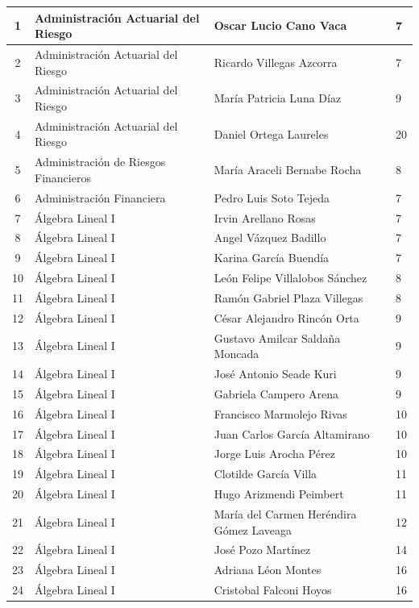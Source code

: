 {\begin{longtable}{|c|p{6.5cm}|p{5cm}|p{1.5cm}|}
1 & Administración Actuarial del Riesgo & Oscar Lucio Cano Vaca & 7 \\ \hline 
2 & Administración Actuarial del Riesgo & Ricardo Villegas Azcorra & 7 \\ \hline 
3 & Administración Actuarial del Riesgo & María Patricia Luna Díaz & 9 \\ \hline 
4 & Administración Actuarial del Riesgo & Daniel Ortega Laureles & 20 \\ \hline 
5 & Administración de Riesgos Financieros & María Araceli Bernabe Rocha & 8 \\ \hline 
6 & Administración Financiera & Pedro Luis Soto Tejeda & 7 \\ \hline 
7 & Álgebra Lineal I & Irvin Arellano Rosas & 7 \\ \hline 
8 & Álgebra Lineal I & Angel Vázquez Badillo & 7 \\ \hline 
9 & Álgebra Lineal I & Karina García Buendía & 7 \\ \hline 
10 & Álgebra Lineal I & León Felipe Villalobos Sánchez & 8 \\ \hline 
11 & Álgebra Lineal I & Ramón Gabriel Plaza Villegas & 8 \\ \hline 
12 & Álgebra Lineal I & César Alejandro Rincón Orta & 9 \\ \hline 
13 & Álgebra Lineal I & Gustavo Amilcar Saldaña Moncada & 9 \\ \hline 
14 & Álgebra Lineal I & José Antonio Seade Kuri & 9 \\ \hline 
15 & Álgebra Lineal I & Gabriela Campero Arena & 9 \\ \hline 
16 & Álgebra Lineal I & Francisco Marmolejo Rivas & 10 \\ \hline 
17 & Álgebra Lineal I & Juan Carlos García Altamirano & 10 \\ \hline 
18 & Álgebra Lineal I & Jorge Luis Arocha Pérez & 10 \\ \hline 
19 & Álgebra Lineal I & Clotilde García Villa & 11 \\ \hline 
20 & Álgebra Lineal I & Hugo Arizmendi Peimbert & 11 \\ \hline 
21 & Álgebra Lineal I & María del Carmen Heréndira Gómez Laveaga & 12 \\ \hline 
22 & Álgebra Lineal I & José Pozo Martínez & 14 \\ \hline 
23 & Álgebra Lineal I & Adriana Léon Montes & 16 \\ \hline 
24 & Álgebra Lineal I & Cristobal Falconi Hoyos & 16 \\ \hline 

\end{longtable}}
